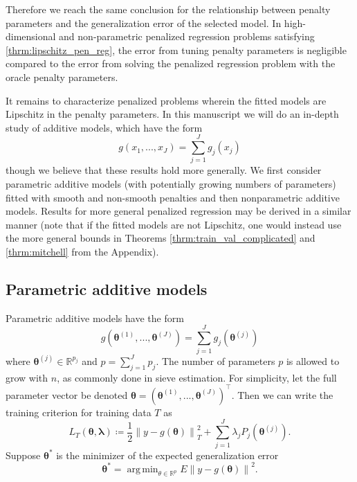 \documentclass[12pt]{article} %
\theoremstyle{definition}
\DeclareMathOperator*{\argmin}{arg\,min}
\begin{document}
Therefore we reach the same conclusion for the relationship between penalty parameters and the generalization error of the selected model. In high-dimensional and non-parametric penalized regression problems satisfying \eqref{thrm:lipschitz_pen_reg}, the error from tuning penalty parameters is negligible compared to the error from solving the penalized regression problem with the oracle penalty parameters.

It remains to characterize penalized problems wherein the fitted models are Lipschitz in the penalty parameters. In this manuscript we will do an in-depth study of additive models, which have the form
\begin{equation}
g(x_1, ..., x_J)= \sum_{j=1}^J g_j(x_j)
\end{equation}
though we believe that these results hold more generally. We first consider parametric additive models (with potentially growing numbers of parameters) fitted with smooth and non-smooth penalties and then nonparametric additive models. Results for more general penalized regression may be derived in a similar manner (note that if the fitted models are not Lipschitz, one would instead use the more general bounds in Theorems \ref{thrm:train_val_complicated} and \ref{thrm:mitchell} from the Appendix).

\subsection{Parametric additive models}
\label{sec:param_add_models}
Parametric additive models have the form
\begin{equation}
g(\boldsymbol{\theta}^{(1)}, ..., \boldsymbol{\theta}^{(J)}) = \sum_{j=1}^J g_j(\boldsymbol{\theta}^{(j)})
\end{equation}
where $\boldsymbol{\theta}^{(j)} \in \mathbb{R}^{p_j}$ and $p = \sum_{j=1}^J p_j$. The number of parameters $p$ is allowed to grow with $n$, as commonly done in sieve estimation. For simplicity, let the full parameter vector be denoted $\boldsymbol{\theta} = \left (\boldsymbol{\theta}^{(1)}, ..., \boldsymbol{\theta}^{(J)} \right )^\top$. Then we can write the training criterion for training data $T$ as
\begin{equation}
\label{eq:param_add}
L_T \left (\boldsymbol{\theta}, \boldsymbol{\lambda} \right) 
\coloneqq \frac{1}{2} \left  \| y -  g(\boldsymbol{\theta}) \right \|^2_T 
+ \sum_{j=1}^J \lambda_j P_j(\boldsymbol{\theta}^{(j)}).
\end{equation}
Suppose $\boldsymbol{\theta}^*$ is the minimizer of the expected generalization error
\begin{equation}
\boldsymbol{\theta}^*
= \argmin_{\theta \in \mathbb{R}^p} E \left \| y - g(\boldsymbol{\theta}) \right\|^2.
\end{equation}
\end{document}
